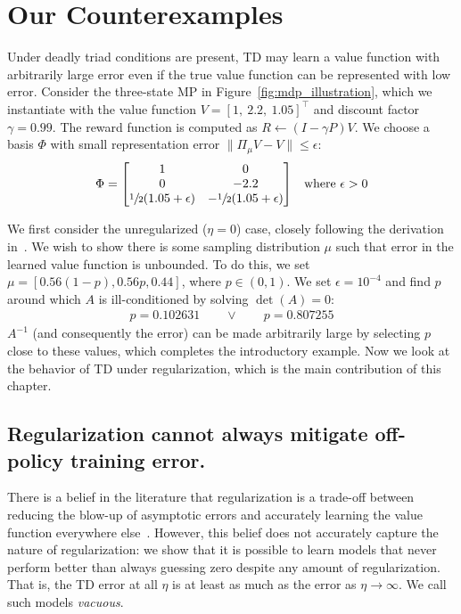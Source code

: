 \section{Our Counterexamples}\label{sec:introduce_example}
Under deadly triad conditions are present, TD may learn a value function with arbitrarily large error even if the true value function can be represented with low error.
Consider the three-state MP in Figure~\ref{fig:mdp_illustration}, which we instantiate with the value function $V = {[1,~2.2,~1.05]}^\top$ and discount factor $\gamma = 0.99$. The reward function is computed as $R \gets (I-\gamma P)V$. We choose a basis $\Phi$ with small representation error $\|\Pi_\mu V - V\| \leq \epsilon$:
\begin{align}
	\Phi & = \begin{bmatrix}
		         1                              & 0                               \\
		         0                              & -2.2                            \\
		         \sfrac{1}{2} (1.05 + \epsilon) & -\sfrac{1}{2} (1.05 + \epsilon) \\
	         \end{bmatrix} & \text{where $\epsilon > 0$}
\end{align}

We first consider the unregularized ($\eta=0$) case, closely following the derivation in~\cite{kolter2011fixed}. We wish to show there is some sampling distribution $\mu$ such that error in the learned value function is unbounded. To do this, we set $\mu=[0.56(1-p), 0.56p, 0.44]$, where $p \in (0, 1)$. We set $\epsilon=10^{-4}$ and find $p$ around which $A$ is ill-conditioned by solving $\det(A) = 0$:
\begin{align}
	p = 0.102631 \qquad \lor \qquad p = 0.807255
\end{align}
$A^{-1}$ (and consequently the error) can be made arbitrarily large by selecting $p$ close to these values, which completes the introductory example. Now we look at the behavior of TD under regularization, which is the main contribution of this chapter.


\subsection{Regularization cannot always mitigate off-policy training error. }\label{sec:rrplotexplained}
There is a belief in the literature that regularization is a trade-off between reducing the blow-up of asymptotic errors and accurately learning the value function everywhere else~\cite{diddigi2019convergent,zhang2021breaking}.
However, this belief does not accurately capture the nature of regularization: we show that it is possible to learn models that never perform better than always guessing zero despite any amount of regularization. That is, the TD error at all $\eta$ is at least as much as the error as $\eta\to\infty$. We call such models \emph{vacuous}.

